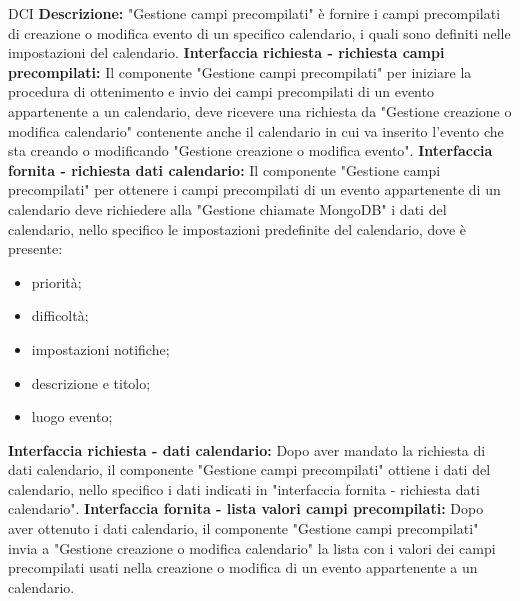 \begin{listaPersonale}{DCI}
    \textbf{Descrizione:}  "Gestione campi precompilati" è fornire i campi precompilati di creazione o modifica evento di un specifico calendario, i quali sono definiti nelle impostazioni del calendario.
    \textbf{Interfaccia richiesta - richiesta campi precompilati:} Il componente "Gestione campi precompilati" per iniziare la procedura di ottenimento e invio dei campi precompilati di un evento appartenente a un calendario, deve ricevere una richiesta da "Gestione creazione o modifica calendario" contenente anche il calendario in cui va inserito l'evento che sta creando o modificando "Gestione creazione o modifica evento".
    \textbf{Interfaccia fornita - richiesta dati calendario:} Il componente "Gestione campi precompilati" per ottenere i campi precompilati di un evento appartenente di un calendario deve richiedere alla "Gestione chiamate MongoDB" i dati del calendario, nello specifico le impostazioni predefinite del calendario, dove è presente:
    \begin{itemize}
        \item priorità;
        \item difficoltà;
        \item impostazioni notifiche;
        \item descrizione e titolo;
        \item luogo evento;
    \end{itemize}
    \textbf{Interfaccia richiesta - dati calendario:} Dopo aver mandato la richiesta di dati calendario, il componente "Gestione campi precompilati" ottiene i dati del calendario, nello specifico i dati indicati in "interfaccia fornita - richiesta dati calendario".
    \textbf{Interfaccia fornita - lista valori campi precompilati:} Dopo aver ottenuto i dati calendario, il componente "Gestione campi precompilati" invia a "Gestione creazione o modifica calendario" la lista con i valori dei campi precompilati usati nella creazione o modifica di un evento appartenente a un calendario.



\end{listaPersonale}
